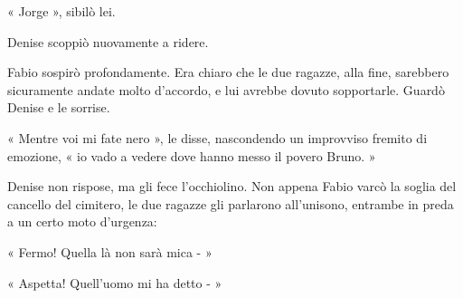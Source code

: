 « Jorge », sibilò lei.

Denise scoppiò nuovamente a ridere.

Fabio sospirò profondamente. Era chiaro che le due ragazze, alla fine, sarebbero sicuramente andate molto d'accordo, e lui avrebbe dovuto sopportarle. Guardò Denise e le sorrise.

« Mentre voi mi fate nero », le disse, nascondendo un improvviso fremito di emozione, « io vado a vedere dove hanno messo il povero Bruno. »

Denise non rispose, ma gli fece l'occhiolino. Non appena Fabio varcò la soglia del cancello del cimitero, le due ragazze gli parlarono all'unisono, entrambe in preda a un certo moto d'urgenza:

« Fermo! Quella là non sarà mica - »

« Aspetta! Quell'uomo mi ha detto - »
